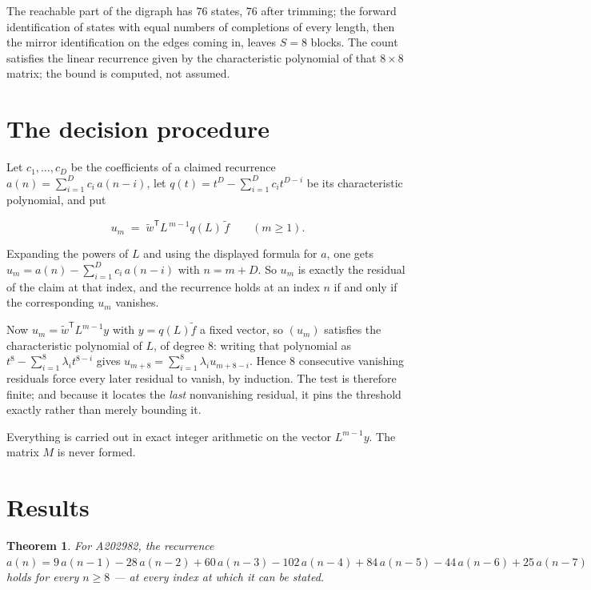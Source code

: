 \documentclass[11pt]{article}
\newtheorem{theorem}{Theorem}
\theoremstyle{definition}
\begin{document}
The reachable part of the digraph has $76$ states, $76$ after trimming; the forward identification of states with equal numbers of completions of every length, then the mirror identification on the edges coming in, leaves $S = 8$ blocks. The count satisfies the linear recurrence given by the characteristic polynomial of that $8\times8$ matrix; the bound is computed, not assumed.

\section{The decision procedure}

Let $c_1,\dots,c_D$ be the coefficients of a claimed recurrence $a(n) = \sum_{i=1}^{D} c_i\,a(n-i)$, let $q(t) = t^{D} - \sum_{i=1}^{D} c_i t^{D-i}$ be its characteristic polynomial, and put

\[u_m \;=\; \tilde w^{\mathsf T} L^{\,m-1} q(L)\,\tilde f \qquad (m \ge 1).\]

Expanding the powers of $L$ and using the displayed formula for $a$, one gets $u_m = a(n) - \sum_{i=1}^{D} c_i\,a(n-i)$ with $n = m + D$. So $u_m$ is exactly the residual of the claim at that index, and the recurrence holds at an index $n$ if and only if the corresponding $u_m$ vanishes.

Now $u_m = \tilde w^{\mathsf T} L^{m-1} y$ with $y = q(L)\tilde f$ a fixed vector, so $(u_m)$ satisfies the characteristic polynomial of $L$, of degree $8$: writing that polynomial as $t^{8} - \sum_{i=1}^{8} \lambda_i t^{8-i}$ gives $u_{m+8} = \sum_{i=1}^{8} \lambda_i u_{m+8-i}$. Hence $8$ consecutive vanishing residuals force every later residual to vanish, by induction. The test is therefore finite; and because it locates the {\itshape last} nonvanishing residual, it pins the threshold exactly rather than merely bounding it.

Everything is carried out in exact integer arithmetic on the vector $L^{m-1}y$. The matrix $M$ is never formed.

\section{Results}

\begin{theorem} For A202982, the recurrence $a(n) = 9\,a(n-1) - 28\,a(n-2) + 60\,a(n-3) - 102\,a(n-4) + 84\,a(n-5) - 44\,a(n-6) + 25\,a(n-7)$ holds for every $n \ge 8$ --- at every index at which it can be stated.\end{theorem}
\end{document}
